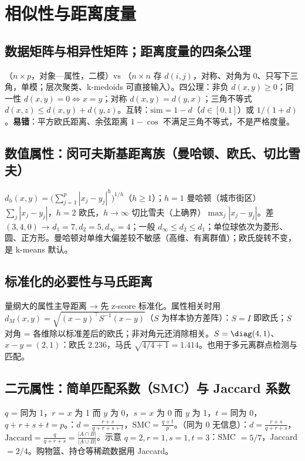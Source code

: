\section{相似性与距离度量}

\subsection{数据矩阵与相异性矩阵；距离度量的四条公理}
（$n\times p$，对象—属性，二模）vs （$n\times n$ 存 $d(i,j)$，对称、对角为 0、只写下三角，单模；层次聚类、k-medoids 可直接输入）。四公理：非负 $d(x,y)\ge0$；同一性 $d(x,y)=0\iff x=y$；对称 $d(x,y)=d(y,x)$；三角不等式 $d(x,z)\le d(x,y)+d(y,z)$。互转：$\mathrm{sim}=1-d$（$d\in[0,1]$）或 $1/(1+d)$。\textbf{易错}：平方欧氏距离、余弦距离 $1-\cos$ 不满足三角不等式，不是严格度量。

\subsection{数值属性：闵可夫斯基距离族（曼哈顿、欧氏、切比雪夫）}
$d_h(x,y)=\big(\sum_{j=1}^p|x_j-y_j|^h\big)^{1/h}$（$h\ge1$）；$h=1$ 曼哈顿（城市街区）$\sum_j|x_j-y_j|$，$h=2$ 欧氏，$h\to\infty$ 切比雪夫（上确界）$\max_j|x_j-y_j|$。差 $(3,4,0)$ → $d_1=7,d_2=5,d_\infty=4$；一般 $d_\infty\le d_2\le d_1$；单位球依次为菱形、圆、正方形。曼哈顿对单维大偏差较不敏感（高维、有离群值）；欧氏旋转不变，是 k-means 默认。

\subsection{标准化的必要性与马氏距离}
量纲大的属性主导距离 → 先 z-score 标准化。属性相关时用 $d_M(x,y)=\sqrt{(x-y)^\top S^{-1}(x-y)}$（$S$ 为样本协方差阵）：$S=I$ 即欧氏；$S$ 对角 = 各维除以标准差后的欧氏；非对角元还消除相关。$S=\diag(4,1)$、$x-y=(2,1)$：欧氏 $2.236$，马氏 $\sqrt{4/4+1}=1.414$。也用于多元离群点检测与匹配。

\subsection{二元属性：简单匹配系数（SMC）与 Jaccard 系数}
$q$ = 同为 1，$r$ = $x$ 为 1 而 $y$ 为 0，$s$ = $x$ 为 0 而 $y$ 为 1，$t$ = 同为 0，$q+r+s+t=p$。：$d=\frac{r+s}{q+r+s+t}$，$\mathrm{SMC}=\frac{q+t}{p}$。（同为 0 无信息）：$d=\frac{r+s}{q+r+s}$，$\text{Jaccard}=\frac{q}{q+r+s}=\frac{|A\cap B|}{|A\cup B|}$。示意 $q=2,r=1,s=1,t=3$：SMC $=5/7$，Jaccard $=2/4$。购物篮、持仓等稀疏数据用 Jaccard。

